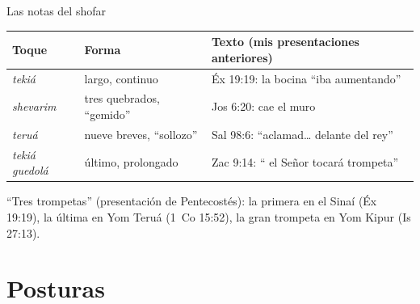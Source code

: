 \begin{frame}{Las notas del shofar}
\renewcommand{\arraystretch}{1.15}\small
\begin{tabular}{@{}L{3.0cm}L{3.4cm}L{5.2cm}@{}}
\toprule
\textbf{Toque} & \textbf{Forma} & \textbf{Texto (mis presentaciones anteriores)} \\ \midrule
{} \emph{tekiá} & largo, continuo & Éx 19:19: la bocina ``iba aumentando'' \\
 \emph{shevarim} & tres quebrados, ``gemido'' & Jos 6:20: cae el muro \\
 \emph{teruá} & nueve breves, ``sollozo'' & Sal 98:6: ``aclamad\ldots{} delante del rey'' \\
 \emph{tekiá guedolá} & último, prolongado & Zac 9:14: ``\SENOR{} el Señor tocará trompeta'' \\
\bottomrule
\end{tabular}\par\medskip
\scriptsize\RaggedRight ``Tres trompetas'' (presentación de Pentecostés): la primera en el Sinaí (Éx 19:19), la última en Yom Teruá (1~Co 15:52), la gran trompeta en Yom Kipur (Is 27:13).\par\smallskip
{}
\end{frame}

\section{Posturas}

